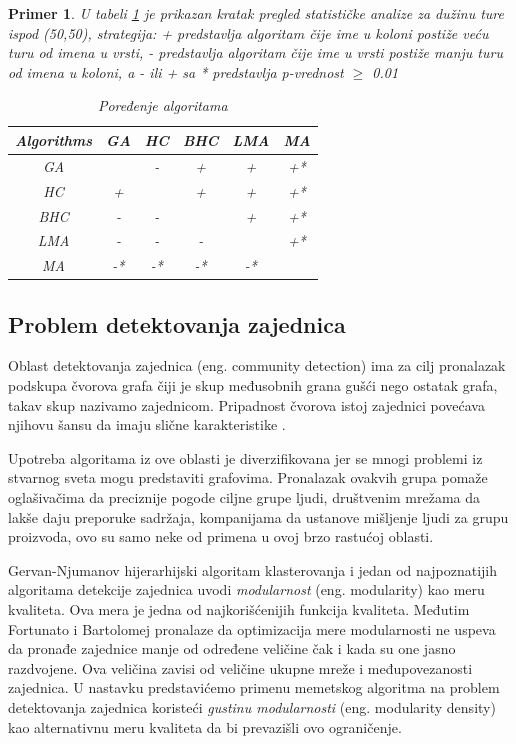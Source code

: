 \documentclass[a4paper]{article}
\newtheorem{primer}{Primer}[section]
\begin{document}
\begin{primer}U tabeli \ref{tab:tabela2} je prikazan kratak pregled statističke analize za dužinu ture ispod (50,50), strategija: + predstavlja algoritam čije ime u koloni postiže veću turu od imena u vrsti, - predstavlja algoritam čije ime u vrsti postiže manju turu od imena u koloni, a - ili + sa * predstavlja p-vrednost $\geq$ 0.01


\begin{table}[h!]
\begin{center}
\caption{Poređenje algoritama}
\begin{tabular}{||c|c|c|c|c|c||} \hline
Algorithms & GA& HC& BHC& LMA& MA\\ \hline
GA &  & - & + & + & +* \\ \hline
HC & + &  & + & + & +* \\ \hline
BHC & - & - &  & + & +* \\ \hline
LMA & - & - & - &  & +* \\ \hline
MA & -* & -* & -* & -* & \\ \hline
\end{tabular}
\label{tab:tabela2}
\end{center}
\end{table}

\end{primer}


\subsection{Problem detektovanja zajednica}
\label{sec:prepoznavanje_zajednica}

Oblast detektovanja zajednica (eng. community detection) ima za cilj pronalazak podskupa čvorova grafa čiji je skup međusobnih grana gušći nego ostatak grafa, takav skup nazivamo zajednicom. Pripadnost čvorova istoj zajednici povećava njihovu šansu da imaju slične karakteristike \cite{gong}.

Upotreba algoritama iz ove oblasti je diverzifikovana jer se mnogi problemi iz stvarnog sveta mogu predstaviti grafovima. Pronalazak ovakvih grupa pomaže oglašivačima da preciznije pogode ciljne grupe ljudi, društvenim mrežama da lakše daju preporuke sadržaja, kompanijama da ustanove mišljenje ljudi za grupu proizvoda, ovo su samo neke od primena u ovoj brzo rastućoj oblasti.

Gervan-Njumanov \cite{newman} hijerarhijski algoritam klasterovanja i jedan od najpoznatijih algoritama detekcije zajednica uvodi \textit{modularnost} (eng. modularity) kao meru kvaliteta. Ova mera je jedna od najkorišćenijih  funkcija kvaliteta. Međutim Fortunato i Bartolomej \cite{fortunato} pronalaze da optimizacija mere modularnosti ne uspeva da pronađe zajednice manje od određene veličine čak i kada su one jasno razdvojene. Ova veličina zavisi od veličine ukupne mreže i međupovezanosti zajednica. U nastavku predstavićemo primenu memetskog algoritma na problem detektovanja zajednica koristeći  \textit{gustinu modularnosti} (eng. modularity density) kao alternativnu meru kvaliteta da bi prevazišli ovo ograničenje.
\end{document}
